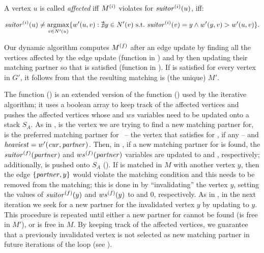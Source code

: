 \begin{definition}
\label{def:dyn-mwm:affected-vertices}
A vertex $u$ is called \emph{affected} iff $M^{(i)}$ violates  for
$\mathit{suitor}^{(i)}(u)$, \ie iff:

\[
\mathit{suitor}^{(i)}(u) \neq \operatorname*{argmax}_{v \in N'(u)}\{w'(u, v) : \nexists y\in N'(v)\ \text{s.t.}
\ \mathit{suitor}^{(i)}(v) = y \wedge w'(y, v) > w'(u, v)\}.
\]
\end{definition}




Our dynamic algorithm computes $M^{(f)}$ after an edge update by finding all the vertices
affected by the edge update (\findaff function in ) and by
then updating their matching partner so that  is satisfied
(\updateaff function in ). If  is
satisfied for every vertex in $G'$, it follows from 
that the resulting matching is (the unique) $M'$.

The \findaff function () is an extended version
of the \findsuitor function () used by the
iterative \suitor algorithm; it uses a boolean array \affected to keep track of
the affected vertices and pushes the affected vertices whose \vsuitor and $ws$
variables need to be updated onto a stack $S_A$.
%
As in \findsuitor, \cur is the vertex we are trying to find a new matching
partner for, \partner is the preferred matching partner for \cur\ -- \ie the
vertex that satisfies  for \cur, if any -- and $\mathit{heaviest} =
w'(\mathit{cur}, \mathit{partner})$.
%
Then, in ,
if a new matching partner for \cur is found, the $\mathit{suitor}^{(f)}(\mathit{partner})$
and $ws^{(f)}(\mathit{partner})$ variables are updated to \cur and \heaviest, respectively;
additionally, \partner is pushed onto $S_A$ ().
If \partner is matched in $M$ with another vertex $y$, then the edge
$\set{\partner, y}$ would violate the matching condition and this needs to be
removed from the matching; this is done in
by \enquote{invalidating} the vertex $y$, \ie setting the values of
$\mathit{suitor}^{(f)}(y)$ and $ws^{(f)}(y)$ to \nil and $0$, respectively.
As in \findsuitor, in the next iteration we seek for a new partner for the
invalidated vertex $y$ by updating \cur to $y$.
%
This procedure is repeated until either a new partner for \cur
cannot be found (\ie \cur is free in $M'$), or \partner is free in $M$.
By keeping track of the affected vertices, we guarantee that a previously
invalidated vertex is not selected as new matching partner in future iterations
of the loop (see ).

